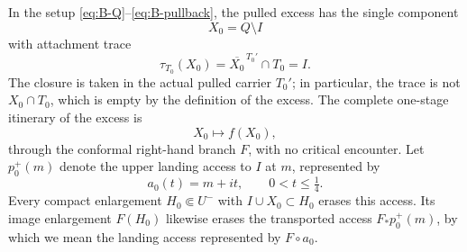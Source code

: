 \begin{proposition}\label{prop:access-collision}
In the setup \eqref{eq:B-Q}--\eqref{eq:B-pullback}, the pulled excess has the
single component
\[
X_0=Q\setminus I
\]
with attachment trace
\[
\tau_{T_0}(X_0)=\overline{X_0}^{\,T_0'}\cap T_0=I .
\]
The closure is taken in the actual pulled carrier $T_0'$; in particular, the
trace is not $X_0\cap T_0$, which is empty by the definition of the excess.
The complete one-stage itinerary of the excess is
\[
X_0\longmapsto f(X_0),
\]
through the conformal right-hand branch $F$, with no critical encounter.
Let $p_0^{+}(m)$ denote the upper landing access to $I$ at $m$, represented
by
\[
a_0(t)=m+it,\qquad 0<t\le\tfrac14.
\]
Every compact enlargement $H_0\Subset U^{-}$ with
$I\cup X_0\subset H_0$ erases this access.  Its image enlargement
$F(H_0)$ likewise erases the transported access
$F_*p_0^{+}(m)$, by which we mean the landing access represented by
$F\circ a_0$.
\end{proposition}

